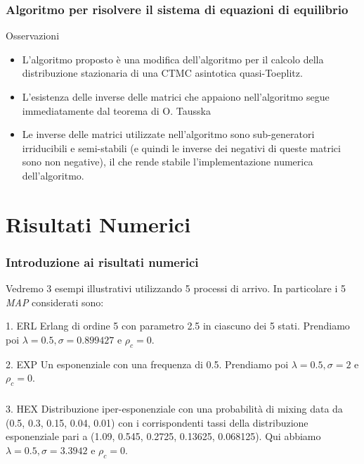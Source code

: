 \documentclass{beamer}
\begin{document}
\begin{frame}
    \frametitle{Algoritmo per risolvere il sistema di equazioni di equilibrio}
\begin{block}{Osservazioni}
        \begin{itemize}
            \item L'algoritmo proposto è una modifica dell'algoritmo per il calcolo della distribuzione stazionaria di una CTMC asintotica quasi-Toeplitz.
            \item L'esistenza delle inverse delle matrici che appaiono nell'algoritmo segue immediatamente dal teorema di O. Tausska
            \item Le inverse delle matrici utilizzate nell'algoritmo sono sub-generatori irriducibili e semi-stabili (e quindi le inverse dei negativi di queste matrici sono non
            negative), il che rende stabile l'implementazione numerica dell'algoritmo.
        \end{itemize}
\end{block}
\end{frame}

\section{Risultati Numerici}
\begin{frame}
    \frametitle{Introduzione ai risultati numerici}
    Vedremo 3 esempi illustrativi utilizzando 5 processi di arrivo. In particolare i 5 \emph{MAP} considerati sono:
    \begin{block}{1. ERL}
        Erlang di ordine 5 con parametro 2.5 in ciascuno dei 5 stati. Prendiamo poi $\lambda = 0.5, \sigma = 0.899427$ e $\rho_c = 0$.
    \end{block}
    \begin{block}{2. EXP}
        Un esponenziale con una frequenza di 0.5. Prendiamo poi $\lambda = 0.5, \sigma = 2$ e $\rho_c = 0$.
    \end{block}
\end{frame}


\begin{frame}
    \frametitle{}
    \begin{block}{3. HEX}
        Distribuzione iper-esponenziale con una probabilità di mixing data da (0.5, 0.3, 0.15, 0.04, 0.01) con i corrispondenti tassi della distribuzione esponenziale pari a (1.09, 0.545, 0.2725, 0.13625, 0.068125). Qui abbiamo $\lambda = 0.5, \sigma = 3.3942$ e $\rho_c = 0$.
    \end{block}
\end{frame}
\end{document}

